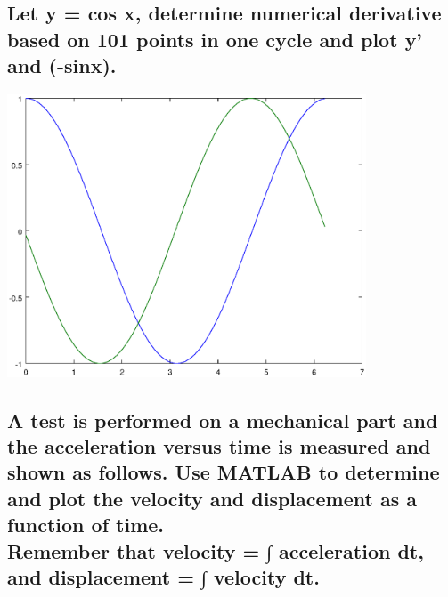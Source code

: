 \documentclass[12pt,a4paper]{article}
\begin{document}
\subsection{Let y = cos x, determine numerical derivative based on 101 points in one cycle and plot y’ and (-sinx).} 

\includegraphics[width=0.8\textwidth]{4.eps}
\subsection{A test is performed on a mechanical part and the acceleration versus time is measured and shown as follows. Use MATLAB to determine and plot the velocity and displacement as a function of time.\\Remember that velocity = ∫ acceleration dt, and displacement = ∫ velocity dt.}
\end{document}
